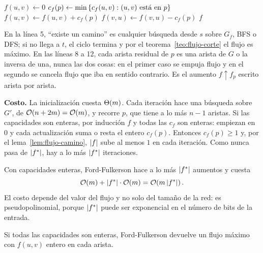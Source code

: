 \documentclass[11pt,letterpaper]{article}
\begin{document}
\begin{algorithm}[H]
\caption{\textsc{Ford-Fulkerson}$(G, s, t)$}
\label{alg:ford-fulkerson}
\begin{algorithmic}[1]
    \State $f(u, v) \gets 0$
  \EndFor
    \State $c_f(p) \gets \min\left\{ c_f(u, v) : (u, v) \text{ está en }
           p \right\}$
        \State $f(u, v) \gets f(u, v) + c_f(p)$
      \Else
        \State $f(v, u) \gets f(v, u) - c_f(p)$
      \EndIf
    \EndFor
  \EndWhile
  \State \Return $f$
\EndProcedure
\end{algorithmic}
\end{algorithm}

En la línea 5, ``existe un camino'' es cualquier búsqueda desde $s$
sobre $G_f$, BFS o DFS; si no llega a $t$, el ciclo termina y por el
teorema~\ref{teo:flujo-corte} el flujo es máximo. En las líneas 8 a
12, cada arista residual de $p$ es una arista de $G$ o la inversa de
una, nunca las dos cosas: en el primer caso se empuja flujo y en el
segundo se cancela flujo que iba en sentido contrario. Es el aumento
$f \uparrow f_p$ escrito arista por arista.

\textbf{Costo.} La inicialización cuesta $\Theta\!\left(m\right)$. Cada iteración
hace una búsqueda sobre $G'$, de $\mathcal{O}\!\left(n + 2m\right) = \mathcal{O}\!\left(m\right)$, y recorre
$p$, que tiene a lo más $n - 1$ aristas. Si las capacidades son
enteras, por inducción $f$ y todas las $c_f$ son enteras: empiezan en
$0$ y cada actualización suma o resta el entero $c_f(p)$. Entonces
$c_f(p) \ge 1$ y, por el lema~\ref{lem:flujo-camino}, $\left\lvert f \right\rvert$ sube
al menos $1$ en cada iteración. Como nunca pasa de $\left\lvert f^* \right\rvert$, hay a
lo más $\left\lvert f^* \right\rvert$ iteraciones.

\begin{resultado}
  Con capacidades enteras, Ford-Fulkerson hace a lo más $\left\lvert f^* \right\rvert$
  aumentos y cuesta
  \[
    \mathcal{O}\!\left(m\right) + \left\lvert f^* \right\rvert \cdot \mathcal{O}\!\left(m\right) = \mathcal{O}\!\left(m \left\lvert f^* \right\rvert\right) .
  \]
  El costo depende del valor del flujo y no solo del tamaño de la red:
  es pseudopolinomial, porque $\left\lvert f^* \right\rvert$ puede ser exponencial en el
  número de bits de la entrada.
\end{resultado}

\begin{corolario}[Integralidad]\label{cor:flujo-integralidad}
  Si todas las capacidades son enteras, Ford-Fulkerson devuelve un
  flujo máximo con $f(u, v)$ entero en cada arista.
\end{corolario}
\end{document}

